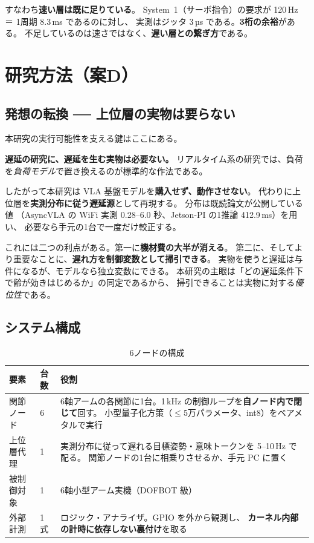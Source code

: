 \documentclass[11pt,a4paper]{article}
\newcommand{\prob}[1]{\textbf{\textcolor{red!55!black}{#1}}}
\newcommand{\keyp}[1]{\textbf{\textcolor{blue!45!black}{#1}}}
\begin{document}
\noindent
すなわち\keyp{速い層は既に足りている}。
System~1（サーボ指令）の要求が 120\,Hz ＝ 1周期 8.3\,ms であるのに対し、
実測はジッタ 3\,µs である。\keyp{3桁の余裕}がある。
不足しているのは速さではなく、\prob{遅い層との繋ぎ方}である。

\section{研究方法（案D）}

\subsection{発想の転換 ── 上位層の実物は要らない}

本研究の実行可能性を支える鍵はここにある。

\keyp{遅延の研究に、遅延を生む実物は必要ない。}
リアルタイム系の研究では、負荷を\emph{負荷モデル}で置き換えるのが標準的な作法である。

したがって本研究は VLA 基盤モデルを\prob{購入せず、動作させない}。
代わりに上位層を\keyp{実測分布に従う遅延源}として再現する。
分布は既読論文が公開している値
（AsyncVLA の WiFi 実測 0.28--6.0 秒、Jetson-PI の1推論 412.9\,ms）を用い、
必要なら手元の1台で一度だけ較正する。

これには二つの利点がある。第一に\keyp{機材費の大半が消える}。
第二に、そしてより重要なことに、\keyp{遅れ方を制御変数として掃引できる}。
実物を使うと遅延は与件になるが、モデルなら独立変数にできる。
本研究の主眼は「どの遅延条件下で齢が効きはじめるか」の同定であるから、
掃引できることは実物に対する\emph{優位性}である。

\subsection{システム構成}

\begin{table}[htbp]
\centering
\small
\caption{6ノードの構成}
\begin{tabularx}{\textwidth}{@{}l l X@{}}
\toprule
\textbf{要素} & \textbf{台数} & \textbf{役割} \\
\midrule
関節ノード & 6 & 6軸アームの各関節に1台。1\,kHz の制御ループを\keyp{自ノード内で閉じて}回す。
  小型量子化方策（$\le$5万パラメータ、int8）をベアメタルで実行 \\
上位層代理 & 1 & 実測分布に従って遅れる目標姿勢・意味トークンを 5--10\,Hz で配る。
  関節ノードの1台に相乗りさせるか、手元 PC に置く \\
被制御対象 & 1 & 6軸小型アーム実機（DOFBOT 級） \\
外部計測 & 1式 & ロジック・アナライザ。GPIO を外から観測し、
  \keyp{カーネル内部の計時に依存しない裏付け}を取る \\
\bottomrule
\end{tabularx}
\end{table}
\end{document}

